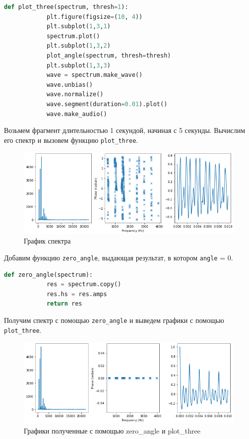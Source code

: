 \documentclass[a4paper, 14pt]{extarticle}
\begin{document}
    \begin{lstlisting}[language=Python, caption= Функция plot\_three, label={lst:plot_three}]
        def plot_three(spectrum, thresh=1):
            plt.figure(figsize=(10, 4))
            plt.subplot(1,3,1)
            spectrum.plot()
            plt.subplot(1,3,2)
            plot_angle(spectrum, thresh=thresh)
            plt.subplot(1,3,3)
            wave = spectrum.make_wave()
            wave.unbias()
            wave.normalize()
            wave.segment(duration=0.01).plot()
            wave.make_audio()
    \end{lstlisting}

    Возьмем фрагмент длительностью 1 секундой, начиная с 5 секунды.
    Вычислим его спектр и вызовем функцию \texttt{plot\_three}.

    \begin{figure}[H]
        \centering
        \includegraphics[width=0.8\linewidth]{oboe_spectrum_plot_three}
        \caption{График спектра}
        \label{fig:oboe_spectrum_plot_three}
    \end{figure}

    Добавим функцию \texttt{zero\_angle}, выдающая результат, в котором \texttt{angle} = 0.

    \begin{lstlisting}[language=Python, caption= Функция zero\_angle, label={lst:zero_angle}]
        def zero_angle(spectrum):
            res = spectrum.copy()
            res.hs = res.amps
            return res
    \end{lstlisting}

    Получим спектр с помощью \texttt{zero\_angle} и выведем графики с помощью \texttt{plot\_three}.

    \begin{figure}[H]
        \centering
        \includegraphics[width=0.8\linewidth]{oboe_zero_angle}
        \caption{Графики полученные с помощью zero\_angle и plot\_three}
        \label{fig:oboe_zero_angle}
    \end{figure}
\end{document}
